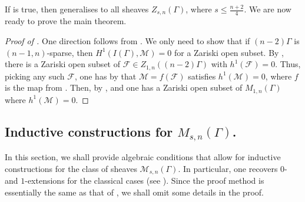 \documentclass{article}
\theoremstyle{definition}
\theoremstyle{remark}
\begin{document}
If  is true, then  generalises to all sheaves $Z_{s, n}(\Gamma)$, where $s \leq \frac{n + 2}{4}$. We are now ready to prove the main theorem.

\begin{proof}[Proof of ]
One direction follows from . We only need to show that if $(n-2)\Gamma$ is $(n-1,n)$-sparse, then $H^{1}(I(\Gamma), \mathcal{M})=0$ for a Zariski open subset. 
By , there is a Zariski open subset of $\mathcal{F} \in Z_{1, n}((n-2)\Gamma)$ with $h^{1}(\mathcal{F})=0$. Thus, picking any such $\mathcal{F}$, one has by  that $\mathcal{M} = f(\mathcal{F})$ satisfies $h^{1}(\mathcal{M}) = 0$, where $f$ is the map from . Then, by , and  one has a Zariski open subset of $M_{1, n}(\Gamma)$ where $h^{1}(\mathcal{M}) = 0$. 
\end{proof}

\subsection{Inductive constructions for $M_{s, n}(\Gamma)$.}
In this section, we shall provide algebraic conditions that allow for inductive constructions for the class of sheaves $\mathcal{M}_{s, n}(\Gamma)$. In particular, one recovers $0$- and $1$-extensions for the classical cases (see ). Since the proof method is essentially the same as that of , we shall omit some details in the proof.
\end{document}
